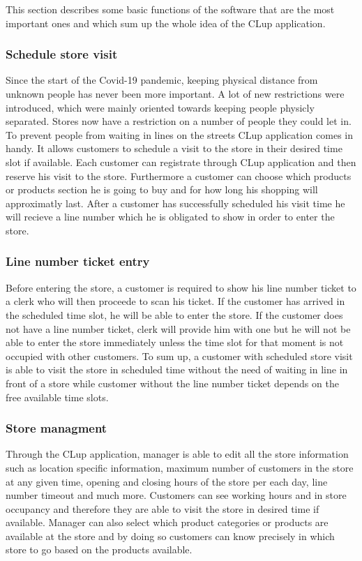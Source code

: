 This section describes some basic functions of the software that are the most important ones and which sum up the whole idea of the CLup application.

\subsubsection {Schedule store visit}
Since the start of the Covid-19 pandemic, keeping physical distance from unknown people has never been more important. A lot of new restrictions were introduced, which were mainly oriented towards keeping people physicly separated. Stores now have a restriction on a number of people they could let in. To prevent people from waiting in lines on the streets CLup application comes in handy. It allows customers to schedule a visit to the store in their desired time slot if available. Each customer can registrate through CLup application and then reserve his visit to the store. Furthermore a customer can choose which products or products section he is going to buy and for how long his shopping will approximatly last. After a customer has successfully scheduled his visit time he will recieve a line number which he is obligated to show in order to enter the store.

\subsubsection {Line number ticket entry}
Before entering the store, a customer is required to show his line number ticket to a clerk who will then proceede to scan his ticket. If the customer has arrived in the scheduled time slot, he will be able to enter the store. If the customer does not have a line number ticket, clerk will provide him with one but he will not be able to enter the store immediately unless the time slot for that moment is not occupied with other customers. To sum up, a customer with scheduled store visit is able to visit the store in scheduled time without the need of waiting in line in front of a store while customer without the line number ticket depends on the free available time slots.

\subsubsection {Store managment}
Through the CLup application, manager is able to edit all the store information such as location specific information, maximum number of customers in the store at any given time, opening and closing hours of the store per each day, line number timeout and much more. Customers can see working hours and in store occupancy and therefore they are able to visit the store in desired time if available. Manager can also select which product categories or products are available at the store and by doing so customers can know precisely in which store to go based on the products available.


